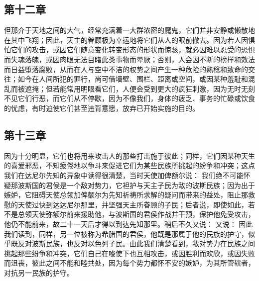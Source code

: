 
\subsection{第十二章}

\par

但那介于天地之间的大气，经常充满着一大群浓密的魔鬼，它们并非安静或懒散地在其中飞翔；因此，天主的眷顾极为幸运地将它们从人的眼前撤去。因为若人因惧怕它们的攻击，或因它们随意变化转变形态的形状而惊骇，就必因难以忍受的恐惧而失魂落魄，或因肉眼无法目睹此类事物而晕厥；否则，人会因不断的榜样和效法而日益堕落腐败，从而在人与空中不洁的权势之间产生一种危险的熟稔和致命的交往；如今在人间所犯的罪行，尚可借墙壁、围栏、距离或空间，或因某种羞耻和混乱而被遮掩；但若能常用明眼看它们，人便会受到更大的疯狂刺激，因为无时无刻不见它们行恶，而它们从不停歇，因为不像我们，身体的疲乏、事务的忙碌或饮食的忧虑，有时迫使它们甚至违背意愿，放弃已开始实施的目的。\par


\subsection{第十三章}

\par

因为十分明显，它们也将用来攻击人的那些打击施于彼此；同样，它们因某种天生的喜爱邪恶，不知疲倦地以争斗来促进它们为某些民族所挑起的纷争和冲突；这点我们在达尼尔先知的异象中读得很清楚，当时天使加俾额尔说：  我们绝不可能怀疑那波斯国的君侯是一个敌对势力，它袒护与天主子民为敌的波斯民族；因为出于嫉妒，它阻碍天使总领加俾额尔为先知祈祷所求解的疑问而带来的益处，阻止那救慰的天使过快到达达尼尔那里，并坚强天主所眷顾的子民；后者说，即使如此，若不是总领天使弥额尔前来援助他，与波斯国的君侯作战并干预，保护他免受攻击，他仍不能前来，故二十一天后才得以到达先知那里。稍后不久又说：  又说：  因此我们读到，同样，另一位被称为希腊国的君侯，他既是那属于他的民族的护守，似乎既反对波斯民族，也反对以色列子民。由此我们清楚看到，敌对势力在民族之间挑起那些纷争和冲突，它们自己在唆使下也互相攻击，或因胜利而欢欣，或因失败而沮丧，彼此之间不能和睦共处，因为每个势力都怀不安的嫉妒，为其所管辖者，对抗另一民族的护守。\par


